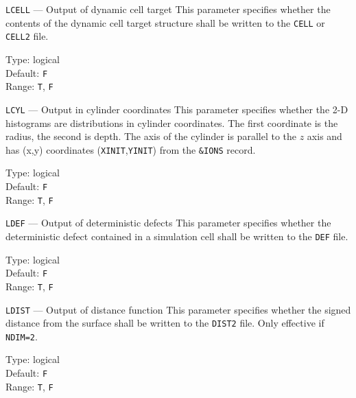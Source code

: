 \begin{keydescription}{\texttt{LCELL} --- Output of dynamic cell target}
%
  This parameter specifies whether the contents of the dynamic cell target structure shall be 
  written to the \texttt{CELL} or \texttt{CELL2} file.
 \begin{keytab}
    Type:    \> logical \\
    Default: \> \texttt{F} \\
    Range:   \> \texttt{T}, \texttt{F} 
  \end{keytab}
\end{keydescription}

\begin{keydescription}{\texttt{LCYL} --- Output in cylinder coordinates}
%
  This parameter specifies whether the 2-D histograms are distributions in cylinder 
  coordinates. The first coordinate is the radius, the second is depth. The axis of the 
  cylinder is parallel to the $z$ axis and has (x,y) coordinates
  (\texttt{XINIT},\texttt{YINIT}) from the \texttt{\&IONS} record.
  \begin{keytab}
    Type:    \> logical \\
    Default: \> \texttt{F} \\
    Range:   \> \texttt{T}, \texttt{F} 
  \end{keytab}
\end{keydescription}

\ifprivate
\begin{keydescription}{\texttt{LDEF} --- Output of deterministic defects}
%
  This parameter specifies whether the deterministic defect contained in a simulation cell 
  shall be written to the \texttt{DEF} file.
  \begin{keytab}
    Type:    \> logical \\
    Default: \> \texttt{F} \\
    Range:   \> \texttt{T}, \texttt{F} 
  \end{keytab}
\end{keydescription}
\fi

\begin{keydescription}{\texttt{LDIST} --- Output of distance function}
%
  This parameter specifies whether the signed distance from the surface shall be written to the 
  \texttt{DIST2} file. Only effective if \texttt{NDIM=2}.
  \begin{keytab}
    Type:    \> logical \\
    Default: \> \texttt{F} \\
    Range:   \> \texttt{T}, \texttt{F} 
  \end{keytab}
\end{keydescription}

